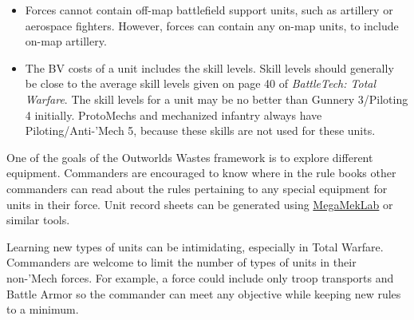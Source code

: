 \begin{itemize}
\item Forces cannot contain off-map battlefield support units, such as artillery or aerospace fighters.
However, forces can contain any on-map units, to include on-map artillery.

\item The BV costs of a unit includes the skill levels.
Skill levels should generally be close to the average skill levels given on page 40 of \emph{BattleTech: Total Warfare}.
The skill levels for a unit may be no better than Gunnery 3/Piloting 4 initially.
ProtoMechs and mechanized infantry always have Piloting/Anti-'Mech 5, because these skills are not used for these units.

\end{itemize}

One of the goals of the Outworlds Wastes framework is to explore different equipment.
Commanders are encouraged to know where in the rule books other commanders can read about the rules pertaining to any special equipment for units in their force.
Unit record sheets can be generated using \href{https://megamek.org}{MegaMekLab} or similar tools.

Learning new types of units can be intimidating, especially in Total Warfare.
Commanders are welcome to limit the number of types of units in their non-'Mech forces.
For example, a force could include only troop transports and Battle Armor so the commander can meet any objective while keeping new rules to a minimum.
